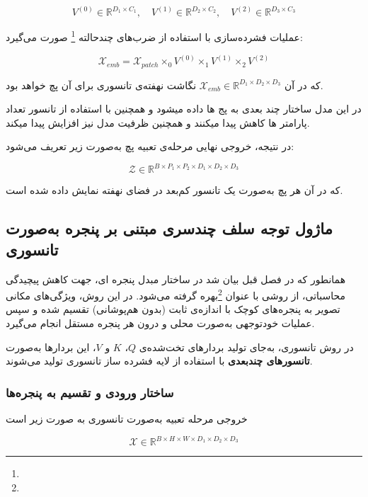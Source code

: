\[
V^{(0)} \in \mathbb{R}^{D_1 \times C_1}, \quad
V^{(1)} \in \mathbb{R}^{D_2 \times C_2}, \quad
V^{(2)} \in \mathbb{R}^{D_3 \times C_3}
\]

عملیات فشرده‌سازی با استفاده از ضرب‌های چندحالته \footnote{} صورت می‌گیرد:

\begin{equation}
	\mathcal{X}_{emb} = \mathcal{X}_{patch} \times_0 V^{(0)} \times_1 V^{(1)} \times_2 V^{(2)}
\end{equation}


که در آن $\mathcal{X}_{emb} \in \mathbb{R}^{D_1 \times D_2 \times D_3}$ نگاشت نهفته‌ی تانسوری برای آن پچ خواهد بود.

در این مدل ساختار چند بعدی به پج ها داده میشود و همچنین با استفاده از تانسور تعداد پارامتر ها کاهش پیدا میکنند و همچنین ظرفیت مدل نیز افزایش پیدا میکند.




در نتیجه، خروجی نهایی مرحله‌ی تعبیه پچ به‌صورت زیر تعریف می‌شود:

\[
\mathcal{Z} \in \mathbb{R}^{B \times P_1 \times P_2 \times D_1 \times D_2 \times D_3}
\]

که در آن هر پچ به‌صورت یک تانسور کم‌بعد در فضای نهفته نمایش داده شده است.


\subsection{ماژول توجه سلف چندسری مبتنی بر پنجره به‌صورت تانسوری}

همانطور که در فصل قبل بیان شد در ساختار مبدل پنجره ای، جهت کاهش پیچیدگی محاسباتی، از روشی با عنوان  \footnote{}بهره گرفته می‌شود. در این روش، ویژگی‌های مکانی تصویر به پنجره‌های کوچک با اندازه‌ی ثابت (بدون هم‌پوشانی) تقسیم شده و سپس عملیات  خود‌توجهی به‌صورت محلی و درون هر پنجره مستقل انجام می‌گیرد.

در روش تانسوری، به‌جای تولید بردارهای تخت‌شده‌ی $Q$، $K$ و $V$، این بردارها به‌صورت \textbf{تانسورهای چندبعدی} با استفاده از لایه فشرده ساز تانسوری تولید می‌شوند.

\subsubsection*{ ساختار ورودی و تقسیم به پنجره‌ها}

خروجی مرحله تعبیه  به‌صورت تانسوری به صورت زیر است 

\[
\mathcal{X} \in \mathbb{R}^{B \times H \times W \times D_1 \times D_2 \times D_3}
\]



